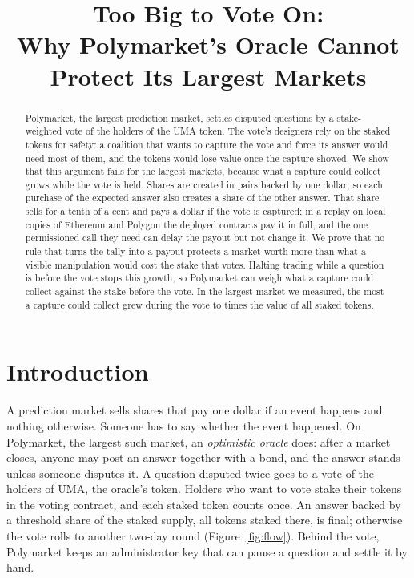 \documentclass[conference,compsoc]{IEEEtran}
\begin{document}
\title{Too Big to Vote On:\\Why Polymarket's Oracle Cannot Protect Its Largest Markets}

\author{
}

\maketitle

\begin{abstract}
Polymarket, the largest prediction market, settles disputed questions by a stake-weighted vote of the holders of the UMA token. The vote's designers rely on the staked tokens for safety: a coalition that wants to capture the vote and force its answer would need most of them, and the tokens would lose value once the capture showed. We show that this argument fails for the largest markets, because what a capture could collect grows while the vote is held. Shares are created in pairs backed by one dollar, so each purchase of the expected answer also creates a share of the other answer. That share sells for a tenth of a cent and pays a dollar if the vote is captured; in a replay on local copies of Ethereum and Polygon the deployed contracts pay it in full, and the one permissioned call they need can delay the payout but not change it. We prove that no rule that turns the tally into a payout protects a market worth more than what a visible manipulation would cost the stake that votes. Halting trading while a question is before the vote stops this growth, so Polymarket can weigh what a capture could collect against the stake before the vote. In the largest market we measured, the most a capture could collect grew during the vote to \econTopOverStake{} times the value of all staked tokens.
\end{abstract}

\section{Introduction}
\label{sec:intro}

A prediction market sells shares that pay one dollar if an event happens and nothing otherwise. Someone has to say whether the event happened. On Polymarket, the largest such market, an \emph{optimistic oracle} does: after a market closes, anyone may post an answer together with a bond, and the answer stands unless someone disputes it. A question disputed twice goes to a vote of the holders of UMA, the oracle's token. Holders who want to vote stake their tokens in the voting contract, and each staked token counts once. An answer backed by a threshold share of the staked supply, all tokens staked there, is final; otherwise the vote rolls to another two-day round (Figure~\ref{fig:flow}). Behind the vote, Polymarket keeps an administrator key that can pause a question and settle it by hand.
\end{document}
